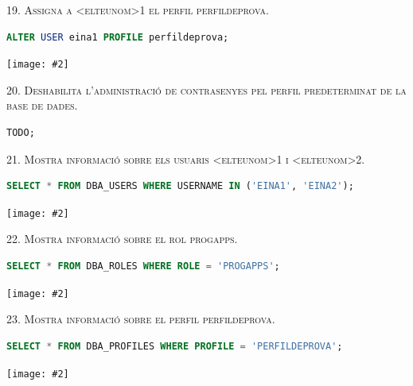 \documentclass[a4paper,12pt]{article}
\newcommand{\mygraphic}[2][width=\textwidth]{\begin{center}
		\centering\texttt{[image: \#2]}\par
\end{center}}
\begin{document}
\newpage
\textsc{19. Assigna a <elteunom>1 el perfil perfildeprova.}
\begin{lstlisting}[language=SQL]
ALTER USER eina1 PROFILE perfildeprova;
\end{lstlisting}
\mygraphic{imatges/19.png}

\textsc{20. Deshabilita l'administració de contrasenyes pel perfil predeterminat de la base de dades.}
\begin{lstlisting}[language=SQL]
TODO;
\end{lstlisting}

\newpage
\textsc{21. Mostra informació sobre els usuaris <elteunom>1 i <elteunom>2.}
\begin{lstlisting}[language=SQL]
SELECT * FROM DBA_USERS WHERE USERNAME IN ('EINA1', 'EINA2');
\end{lstlisting}
\mygraphic{imatges/21.png}

\textsc{22. Mostra informació sobre el rol progapps.}
\begin{lstlisting}[language=SQL]
SELECT * FROM DBA_ROLES WHERE ROLE = 'PROGAPPS';
\end{lstlisting}
\mygraphic{imatges/22.png}

\newpage
\textsc{23. Mostra informació sobre el perfil perfildeprova.}
\begin{lstlisting}[language=SQL]
SELECT * FROM DBA_PROFILES WHERE PROFILE = 'PERFILDEPROVA';
\end{lstlisting}
\mygraphic{imatges/23.png}
\end{document}
